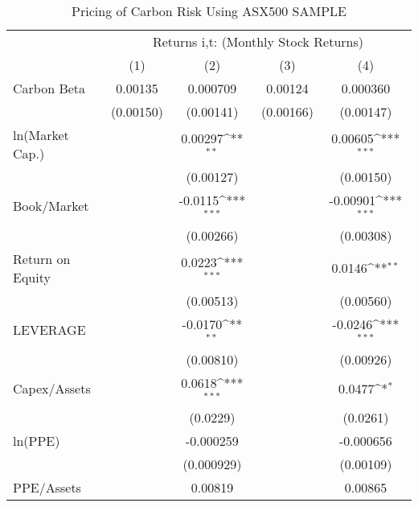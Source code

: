 \begin{table}[htbp]\centering
\def\sym#1{\ifmmode^{#1}\else\(^{#1}\)\fi}
\caption{Pricing of Carbon Risk Using ASX500 SAMPLE}
\begin{tabular}{l*{4}{c}}
\hline\hline
                &\multicolumn{4}{c}{Returns i,t: (Monthly Stock Returns) }                  \\\cmidrule(lr){2-5}
                &\multicolumn{1}{c}{(1)}         &\multicolumn{1}{c}{(2)}         &\multicolumn{1}{c}{(3)}         &\multicolumn{1}{c}{(4)}         \\
\hline
Carbon Beta     &  0.00135         & 0.000709         &  0.00124         & 0.000360         \\
                &(0.00150)         &(0.00141)         &(0.00166)         &(0.00147)         \\
ln(Market Cap.) &                  &  0.00297\sym{**} &                  &  0.00605\sym{***}\\
                &                  &(0.00127)         &                  &(0.00150)         \\
Book/Market     &                  &  -0.0115\sym{***}&                  & -0.00901\sym{***}\\
                &                  &(0.00266)         &                  &(0.00308)         \\
Return on Equity&                  &   0.0223\sym{***}&                  &   0.0146\sym{**} \\
                &                  &(0.00513)         &                  &(0.00560)         \\
LEVERAGE        &                  &  -0.0170\sym{**} &                  &  -0.0246\sym{***}\\
                &                  &(0.00810)         &                  &(0.00926)         \\
Capex/Assets    &                  &   0.0618\sym{***}&                  &   0.0477\sym{*}  \\
                &                  & (0.0229)         &                  & (0.0261)         \\
ln(PPE)         &                  &-0.000259         &                  &-0.000656         \\
                &                  &(0.000929)         &                  &(0.00109)         \\
PPE/Assets      &                  &  0.00819         &                  &  0.00865         \\

\end{tabular}
\end{table}
